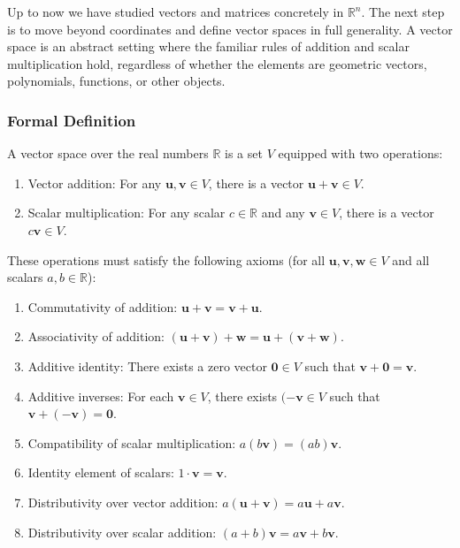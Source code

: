 \documentclass[
  12pt,
  a4paper,
]{article}
\begin{document}
Up to now we have studied vectors and matrices concretely in
\(\mathbb{R}^n\). The next step is to move beyond coordinates and define
vector spaces in full generality. A vector space is an abstract setting
where the familiar rules of addition and scalar multiplication hold,
regardless of whether the elements are geometric vectors, polynomials,
functions, or other objects.

\subsubsection{Formal Definition}\label{formal-definition-2}

A vector space over the real numbers \(\mathbb{R}\) is a set \(V\)
equipped with two operations:

\begin{enumerate}
\def\labelenumi{\arabic{enumi}.}
\item
  Vector addition: For any \(\mathbf{u}, \mathbf{v} \in V\), there is a
  vector \(\mathbf{u} + \mathbf{v} \in V\).
\item
  Scalar multiplication: For any scalar \(c \in \mathbb{R}\) and any
  \(\mathbf{v} \in V\), there is a vector \(c\mathbf{v} \in V\).
\end{enumerate}

These operations must satisfy the following axioms (for all
\(\mathbf{u}, \mathbf{v}, \mathbf{w} \in V\) and all scalars
\(a,b \in \mathbb{R}\)):

\begin{enumerate}
\def\labelenumi{\arabic{enumi}.}
\item
  Commutativity of addition:
  \(\mathbf{u} + \mathbf{v} = \mathbf{v} + \mathbf{u}\).
\item
  Associativity of addition:
  \((\mathbf{u} + \mathbf{v}) + \mathbf{w} = \mathbf{u} + (\mathbf{v} + \mathbf{w})\).
\item
  Additive identity: There exists a zero vector \(\mathbf{0} \in V\)
  such that \(\mathbf{v} + \mathbf{0} = \mathbf{v}\).
\item
  Additive inverses: For each \(\mathbf{v} \in V\), there exists
  \((-\mathbf{v} \in V\) such that
  \(\mathbf{v} + (-\mathbf{v}) = \mathbf{0}\).
\item
  Compatibility of scalar multiplication:
  \(a(b\mathbf{v}) = (ab)\mathbf{v}\).
\item
  Identity element of scalars: \(1 \cdot \mathbf{v} = \mathbf{v}\).
\item
  Distributivity over vector addition:
  \(a(\mathbf{u} + \mathbf{v}) = a\mathbf{u} + a\mathbf{v}\).
\item
  Distributivity over scalar addition:
  \((a+b)\mathbf{v} = a\mathbf{v} + b\mathbf{v}\).
\end{enumerate}
\end{document}

